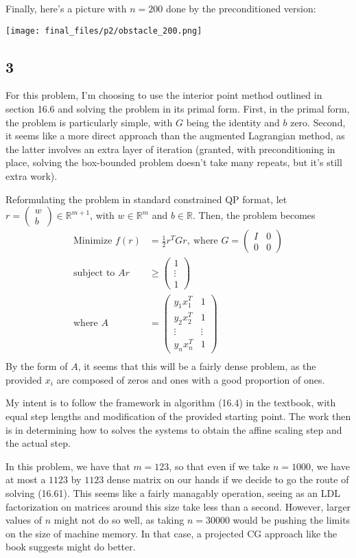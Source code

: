 \documentclass{article}
\newcommand{\openm}{\begin{pmatrix}}
\newcommand{\closem}{\end{pmatrix}}
\newcommand{\rn}{\mathbb{R}}
\begin{document}
Finally, here's a picture with $n=200$ done by the preconditioned version:

\texttt{[image: final\_files/p2/obstacle\_200.png]}
\subsection*{3}
For this problem, I'm choosing to use the interior point method outlined in section 16.6 and solving the problem in its primal form. First, in the primal form, the problem is particularly simple, with $G$ being the identity and $b$ zero. Second, it seems like a more direct approach than the augmented Lagrangian method, as the latter involves an extra layer of iteration (granted, with preconditioning in place, solving the box-bounded problem doesn't take many repeats, but it's still extra work). 

Reformulating the problem in standard constrained QP format, let $r=\openm w\\b\closem\in\rn^{m+1}$, with $w\in\rn^m$ and $b\in\rn$. Then, the problem becomes 
\begin{align*}
    \text{Minimize }f(r)&=\frac{1}{2}r^TGr,\ \text{where }G=\openm I&0\\0&0\closem\\
    \text{subject to }Ar&\geq\openm 1\\\vdots\\1\closem\\
    \text{where }A&=\openm y_1x_1^T&1\\y_2x_2^T&1\\\vdots&\vdots\\y_nx_n^T&1\closem\\
\end{align*}
By the form of $A$, it seems that this will be a fairly dense problem, as the provided $x_i$ are composed of zeros and ones with a good proportion of ones. 

My intent is to follow the framework in algorithm (16.4) in the textbook, with equal step lengths and modification of the provided starting point. The work then is in determining how to solves the systems to obtain the affine scaling step and the actual step. 

In this problem, we have that $m=123$, so that even if we take $n=1000$, we have at most a $1123$ by $1123$ dense matrix on our hands if we decide to go the route of solving (16.61). This seems like a fairly managably operation, seeing as an LDL factorization on matrices around this size take less than a second. However, larger values of $n$ might not do so well, as taking $n=30000$ would be pushing the limits on the size of machine memory. In that case, a projected CG approach like the book suggests might do better.
\end{document}
